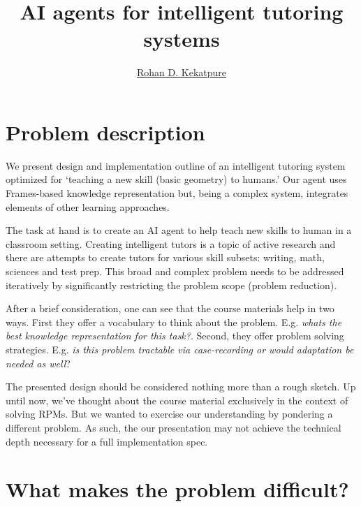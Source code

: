 \documentclass[10pt,letterpaper]{article}
\begin{document}
\title{\Large{AI agents for intelligent tutoring systems}}
\author{\href{mailto:rohan.kekatpure@gmail.com}{Rohan D. Kekatpure}}
\section{Problem description}

We present design and implementation outline of an intelligent tutoring system optimized for `teaching a new skill (basic geometry) to humans.' Our agent uses Frames-based knowledge representation but, being a complex system, integrates elements of other learning approaches. 

The task at hand is to create an AI agent to help teach new skills to human in a classroom setting. Creating intelligent tutors is a topic of active research and there are attempts to create tutors for various skill subsets: writing, math, sciences and test prep. This broad and complex problem needs to be addressed iteratively by significantly restricting the problem scope (problem reduction).

After a brief consideration, one can see that the course materials help in two ways. First they offer a vocabulary to think about the problem. E.g. {\em whats the best knowledge representation for this task?}. Second, they offer problem solving strategies. E.g. {\em is this problem tractable via case-recording or would adaptation be needed as well}?

The presented design should be considered nothing more than a rough sketch. Up until now, we've thought about the course material exclusively in the context of solving RPMs. But we wanted to exercise our understanding by pondering a different problem. As such, the our presentation may not achieve the technical depth necessary for a full implementation spec.

\section{What makes the problem difficult?}
\end{document}
